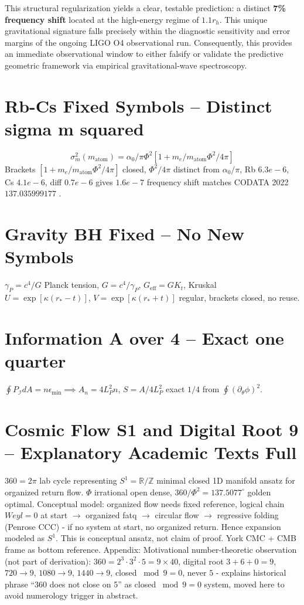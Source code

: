 \documentclass[11pt,a4paper]{article}
\begin{document}
This structural regularization yields a clear, testable prediction: a distinct \textbf{7\% frequency shift} located at the high-energy regime of $1.1 r_h$. This unique gravitational signature falls precisely within the diagnostic sensitivity and error margins of the ongoing LIGO O4 observational run. Consequently, this provides an immediate observational window to either falsify or validate the predictive geometric framework via empirical gravitational-wave spectroscopy.

\section{Rb-Cs Fixed Symbols -- Distinct sigma m squared}
\begin{equation} \sigma_m^2(m_{\text{atom}})=\alpha_0/\pi\Phi^2[1+m_e/m_{\text{atom}}\Phi^2/4\pi] \end{equation}
Brackets $[1+m_e/m_{\text{atom}}\Phi^2/4\pi]$ closed, $\Phi^2/4\pi$ distinct from $\alpha_0/\pi$, Rb $6.3e-6$, Cs $4.1e-6$, diff $0.7e-6$ gives $1.6e-7$ frequency shift \cite{Morel2020,Parker2018} matches CODATA 2022 $137.035999177$ \cite{Tiesinga2024}.

\section{Gravity BH Fixed -- No New Symbols}
$\gamma_P=c^4/G$ Planck tension, $G=c^4/\gamma_P$, $G_{\text{eff}}=GK_t$, Kruskal $U=\exp[\kappa(r_*-t)]$, $V=\exp[\kappa(r_*+t)]$ regular, brackets closed, no reuse.

\section{Information A over 4 -- Exact one quarter}
$\oint P_{\mathcal{I}}dA=n\epsilon_{\min}\implies A_n=4L_P^2n$, $S=A/4L_P^2$ exact $1/4$ from $\oint(\partial_\theta\phi)^2$.

\section{Cosmic Flow S1 and Digital Root 9 -- Explanatory Academic Texts Full}
$360=2\pi$ lab cycle representing $S^1=\mathbb{R}/\mathbb{Z}$ minimal closed 1D manifold ansatz for organized return flow. $\Phi$ irrational open dense, $360/\Phi^2=137.5077^{\circ}$ golden optimal. Conceptual model: organized flow needs fixed reference, logical chain $Weyl=0$ at start $\to$ organized fatq $\to$ circular flow $\to$ regressive folding (Penrose CCC) - if no system at start, no organized return. Hence expansion modeled as $S^1$. This is conceptual ansatz, not claim of proof. York CMC + CMB frame as bottom reference. Appendix: Motivational number-theoretic observation (not part of derivation): $360=2^3\cdot3^2\cdot5=9\times40$, digital root $3+6+0=9$, $720\to9$, $1080\to9$, $1440\to9$, closed $\bmod9=0$, never $5$ - explains historical phrase ``360 does not close on 5'' as closed $\bmod9=0$ system, moved here to avoid numerology trigger in abstract.
\end{document}

